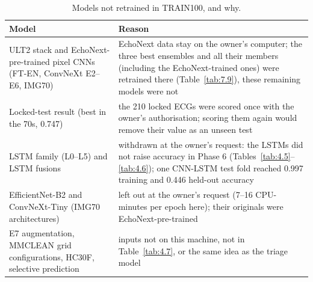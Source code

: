 \begin{table}[htbp]
\caption{Models not retrained in TRAIN100, and why.}\label{tab:7.10}
\small
\begin{tabular}{>{\raggedright\arraybackslash\hspace{0pt}}p{}>{\raggedright\arraybackslash\hspace{0pt}}p{}}
\toprule
\textbf{Model} & \textbf{Reason} \\
\midrule
ULT2 stack and EchoNext-pre-trained pixel CNNs (FT-EN, ConvNeXt E2--E6, IMG70) & EchoNext data stay on the owner's computer; the three best ensembles and all their members (including the EchoNext-trained ones) were retrained there (Table~\ref{tab:7.9}), these remaining models were not \\
Locked-test result (best in the 70s, 0.747) & the 210 locked ECGs were scored once with the owner's authorisation; scoring them again would remove their value as an unseen test \\
LSTM family (L0--L5) and LSTM fusions & withdrawn at the owner's request: the LSTMs did not raise accuracy in Phase 6 (Tables~\ref{tab:4.5}--\ref{tab:4.6}); one CNN-LSTM test fold reached 0.997 training and 0.446 held-out accuracy \\
EfficientNet-B2 and ConvNeXt-Tiny (IMG70 architectures) & left out at the owner's request (7--16 CPU-minutes per epoch here); their originals were EchoNext-pre-trained \\
E7 augmentation, MMCLEAN grid configurations, HC30F, selective prediction & inputs not on this machine, not in Table~\ref{tab:4.7}, or the same idea as the triage model \\
\bottomrule
\end{tabular}
\end{table}
